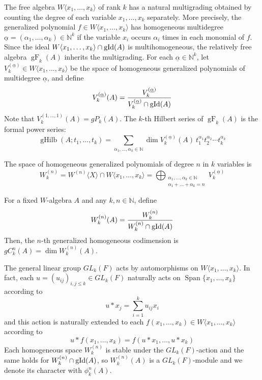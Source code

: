 \documentclass{article}
\newcommand{\bN}{\mathbb{N}}
\DeclareMathOperator{\spn}{Span}
\DeclareMathOperator{\gid}{\textnormal{gId}}
\DeclareMathOperator{\Hilb}{gHilb}
\DeclareMathOperator{\F}{gF}
\begin{document}
The free algebra $W\langle x_1,\dots,x_k\rangle$ of rank $k$ has a natural multigrading obtained by counting the degree of each variable $x_1,\dots,x_k$ separately. More precisely, the generalized polynomial $f\in W\langle x_1,\dots,x_k\rangle$ has homogeneous multidegree $\underline{\alpha}=(\alpha_1,\dots,\alpha_k)\in \bN^k$ if the variable $x_i$ occurs $\alpha_i$ times in each monomial of $f$. Since the ideal $W\langle x_1,\dots,x_k\rangle\cap \gid(A)$ is multihomogeneous, the relatively free algebra $\F_k(A)$ inherits the multigrading. For each $\underline{\alpha}\in \bN^k$, let $V_k^{(\underline{\alpha})}\in W\langle x_1,\dots,x_k\rangle$ be the space of homogeneous generalized polynomials of multidegree $\underline{\alpha}$, and define
\[ V_k^{(\underline{\alpha})}(A)= \frac{V_k^{(\underline{\alpha})}}{V_k^{(\underline{\alpha})}\cap \gid(A)}\]
Note that $V_k^{(1,\dots,1)}(A)=gP_k(A)$. The $k$-th Hilbert series of $\F_k(A)$ is the formal power series:
\[ \Hilb(A; t_1,\dots,t_k) = \sum_{\alpha_1,\dots,\alpha_k\in\bN} \dim V_k^{(\underline{\alpha})}(A)\  t_1^{\alpha_1} t_2^{\alpha_2}  \cdots t_k^{\alpha_k} \]

The space of homogeneous generalized polynomials of degree $n$ in $k$ variables is 
\[ W_k^{(n)} = W^{(n)}\langle X\rangle\cap W\langle x_1,\dots,x_k\rangle = \bigoplus_{\substack{\alpha_1,\dots,\alpha_k\in\bN \\ \alpha_1+\dots+\alpha_k = n}} V_k^{(\underline{\alpha})} \]

For a fixed $W$-algebra $A$ and any $k,n\in\bN$, define
\[ W_k^{(n)}(A) = \frac{W_k^{(n)}}{W_k^{(n)}\cap \gid(A)} \]
Then, the $n$-th generalized homogeneous codimension is $gC_k^n (A)= \dim  W_k^{(n)}(A)$.

The general linear group $GL_k(F)$ acts by automorphisms on $W\langle x_1,\dots, x_k\rangle$. In fact, each $u=(u_{ij})_{i,j\leq k}\in GL_k(F)$ naturally acts on $\spn\{x_1,\dots,x_k\}$ according to
\[ u \ast x_j = \sum_{i=1}^k u_{ij}x_i  \]
and this action is naturally extended to each $f(x_1,\dots,x_k)\in W\langle x_1,\dots, x_k\rangle$ according to
\[ u \ast f(x_1,\dots,x_k) = f(u\ast x_1,\dots, u\ast x_k) \]
Each homogeneous space $W^{(n)}_k$ is stable under the $GL_k(F)$-action and the same holds for $W^{(n)}_k\cap \gid(A)$, so $W^{(n)}_k(A)$ is a $GL_k(F)$-module and we denote its character with $\phi_k^n(A)$. 
\end{document}
